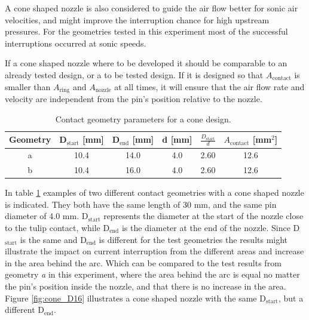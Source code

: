 \documentclass[10pt,a4paper,twoside]{article}
\begin{document}
A cone shaped nozzle is also considered to guide the air flow better for sonic air velocities, and might improve the interruption chance for high upstream pressures. For the geometries tested in this experiment most of the successful interruptions occurred at sonic speeds.

If a cone shaped nozzle where to be developed it should be comparable to an already tested design, or a to be tested design. If it is designed so that $A_\mathrm{{contact}}$ is smaller than $A_\mathrm{{ring}}$ and $A_\mathrm{{nozzle}}$ at all times, it will ensure that the air flow rate and velocity are independent from the pin's position relative to the nozzle. 

\begin{table}[H]
\center
\caption{Contact geometry parameters for a cone design.}
 \begin{tabular}{|c|c|c|c|c|c|}
\hline 
Geometry & D$_\mathrm{{start}}$ [mm]& D$_\mathrm{{end}}$ [mm] & d [mm] & $\frac{D_\mathrm{{start}}}{d}$ & $A_\mathrm{{contact}}$ [mm$^2$] \\ 
\hline 
a & 10.4 & 14.0 & 4.0 & 2.60 & 12.6  \\ 
\hline 
b & 10.4 & 16.0 & 4.0 & 2.60 & 12.6  \\ 
\hline 
\end{tabular} 
\label{tab:contGeoParaCone}
\end{table}

In table \ref{tab:contGeoParaCone} examples of two different contact geometries with a cone shaped nozzle is indicated. They both have the same length of 30 mm, and the same pin diameter of 4.0 mm. D$_\mathrm{{start}}$ represents the diameter at the start of the nozzle close to the tulip contact, while D$_\mathrm{{end}}$ is the diameter at the end of the nozzle. Since D$_\mathrm{{start}}$ is the same and D$_\mathrm{{end}}$ is different for the test geometries the results might illustrate the impact on current interruption from the different areas and increase in the area behind the arc. Which can be compared to the test results from geometry \textit{a} in this experiment, where the area behind the arc is equal no matter the pin's position inside the nozzle, and that there is no increase in the area. Figure \ref{fig:cone_D16} illustrates a cone shaped nozzle with the same  D$_\mathrm{{start}}$, but a different D$_\mathrm{{end}}$. 
\end{document}
